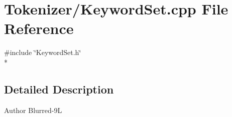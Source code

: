\section{Tokenizer/\-Keyword\-Set.cpp File Reference}
\label{_keyword_set_8cpp}
{\ttfamily \#include \char`\"{}Keyword\-Set.\-h\char`\"{}}\\*


\subsection{Detailed Description}
\begin{DoxyAuthor}{Author}
Blurred-\/9\-L 
\end{DoxyAuthor}
